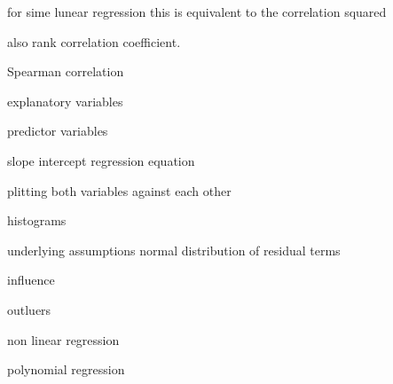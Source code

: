 for sime lunear regression this is equivalent to the correlation squared


also rank correlation coefficient.

Spearman correlation




explanatory variables

predictor variables

slope intercept regression  equation

plitting both variables against each other

histograms 


underlying assumptions normal distribution of residual terms


influence

outluers

 non linear regression

 polynomial regression

